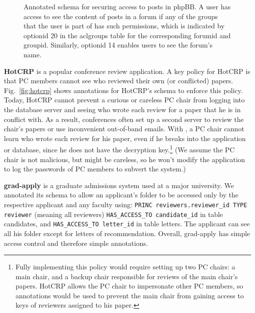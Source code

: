 \begin{figure}[t!]
\begin{framed}
\begin{tabbing}
\end{tabbing}
\vspace{-0.15in}

\end{framed}

\caption{Annotated schema for securing access to posts in phpBB\@. A
  user has access to see the content of posts in a forum if any of the
  groups that the user is part of has such permissions, which is indicated
  by optionid 20 in the aclgroups table for the corresponding forumid
  and groupid. Similarly, optionid 14 enables users to see the forum's
  name.}

\label{fig:posts}
\end{figure}


{\bf HotCRP} is a popular conference review application.  A key policy
for HotCRP is that PC members cannot see who reviewed their own (or
conflicted) papers.  Fig.~\ref{fig:hotcrp} shows \name annotations for
HotCRP's schema to enforce this policy.  Today, HotCRP cannot prevent
a curious or careless PC chair from logging into the database server
and seeing who wrote each review for a paper that he is in conflict
with.  As a result, conferences often set up a second server to review
the chair's papers or use inconvenient out-of-band emails.  With
\name, a PC chair cannot learn who wrote each review for his paper,
even if he breaks into the application or database, since he does not
have the decryption key.\footnote{Fully implementing this policy would
  require setting up two PC chairs: a main chair, and a backup chair
  responsible for reviews of the main chair's papers.  HotCRP allows
  the PC chair to impersonate other PC members, so \name annotations
  would be used to prevent the main chair from gaining access to keys
  of reviewers assigned to his paper.} (We assume the PC chair is not
malicious, but might be careless, so he won't modify the application
to log the passwords of PC members to subvert the system.)


{\bf grad-apply} is a graduate admissions system used at a major
university.  We annotated its schema to allow an applicant's folder to be accessed only by the respective applicant and any faculty using: 
 {\tt \small PRINC reviewers.reviewer\_id TYPE reviewer} (meaning all reviewers) {\tt \small HAS\_ACCESS\_TO candidate\_id} in table candidates, and {\tt \small HAS\_ACCESS\_TO letter\_id} in table letters. The applicant can see all his folder except for letters of recommendation.  Overall, grad-apply has simple access control and therefore simple
annotations. 


